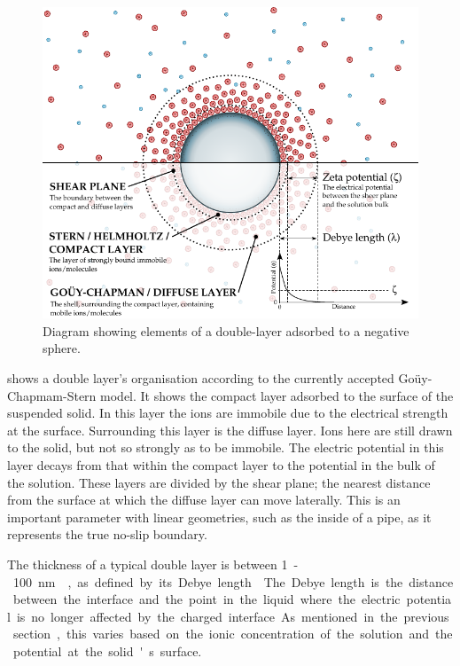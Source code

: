     \begin{figure}
      \begin{center}
        \includegraphics{content/introduction/graphics/doubleLayer_version2}
      \end{center}
      \caption{Diagram showing elements of a double-layer adsorbed to a negative sphere.}
      \label{fig:doubleLayer_anatomy}
    \end{figure}
     shows a double layer's organisation according to the currently accepted Goüy-Chapmam-Stern model.
    It shows the compact layer adsorbed to the surface of the suspended solid.
    In this layer the ions are immobile due to the electrical strength at the surface.
    Surrounding this layer is the diffuse layer.
    Ions here are still drawn to the solid, but not so strongly as to be immobile.
    The electric potential in this layer decays from that within the compact layer to the potential in the bulk of the solution.
    These layers are divided by the shear plane; the nearest distance from the surface at which the diffuse layer can move laterally.
    This is an important parameter with linear geometries, such as the inside of a pipe, as it represents the true no-slip boundary.

    The thickness of a typical double layer is between \SI{1}-\SI{100}{\nano\meter}~\cite{Jiang2010}, as defined by its Debye length~\cite{Israelachvili2011}.
    The Debye length is the distance between the interface and the point in the liquid where the electric potential is no longer affected by the charged interface.
    As mentioned in the previous section, this varies based on the ionic concentration of the solution and the potential at the solid's surface.


